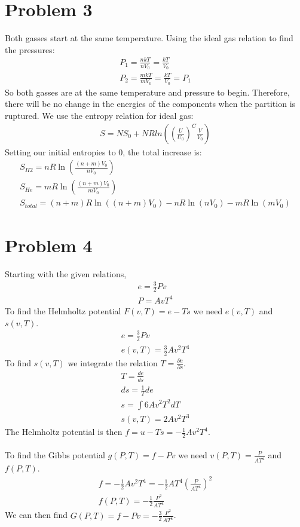 \documentclass[a4paper,10pt]{article}
\numberwithin{equation}{section}
\begin{document}
\section{Problem 3}
Both gasses start at the same temperature. Using the ideal gas relation to find the pressures:
\begin{gather}
 P_1=\frac{nkT}{nV_0}=\frac{kT}{V_0}\\
 P_2=\frac{mkT}{mV_0}=\frac{kT}{V_0}=P_1
\end{gather}
So both gasses are at the same temperature and pressure to begin.
Therefore, there will be no change in the energies of the components when the partition is ruptured.
We use the entropy relation for ideal gas:
\begin{gather}
 S=NS_0+NRln\left (\left(\frac{U}{U_0}\right )^C\frac{V}{V_0}\right )
\end{gather}
Setting our initial entropies to 0, the total increase is:
\begin{gather}
 S_{H2}=nR\ln{\left(\frac{(n+m)V_0}{nV_0} \right)}\\
 S_{He}=mR\ln{\left(\frac{(n+m)V_0}{mV_0} \right)}\\
 S_{total} = (n+m)R\ln{\left((n+m)V_0\right )}-nR\ln{(nV_0)}-mR\ln{(mV_0)}
\end{gather}


\section{Problem 4}
Starting with the given relations,
\begin{gather}
 e = \frac{3}{2}Pv\\
 P = AvT^4
\end{gather}
To find the Helmholtz potential $F(v,T)=e-Ts$ we need $e(v,T)$ and $s(v,T)$. 
\begin{gather}
 e = \frac{3}{2}Pv\\
 e(v,T) = \frac{3}{2}Av^2T^4
\end{gather}
To find $s(v,T)$ we integrate the relation $T=\frac{\partial e}{\partial s}$.
\begin{gather}
 T=\frac{de}{ds}\\
 ds = \frac{1}{T}de\\
 s = \int 6Av^2T^2 dT\\
 s(v,T) = 2Av^2T^3
\end{gather}
The Helmholtz potential is then $f=u-Ts=-\frac{1}{2}Av^2T^4$.\\ \\
To find the Gibbs potential $g(P,T)=f-Pv$ we need $v(P,T)=\frac{P}{AT^4}$ and
$f(P,T)$.
\begin{gather}
 f=-\frac{1}{2}Av^2T^4=-\frac{1}{2}AT^4\left(\frac{P}{AT^4}\right)^2\\
 f(P,T) = -\frac{1}{2}\frac{P^2}{AT^4}
\end{gather}
We can then find $G(P,T) = f-Pv = -\frac{3}{2}\frac{P^2}{AT^4}$. 
\end{document}
